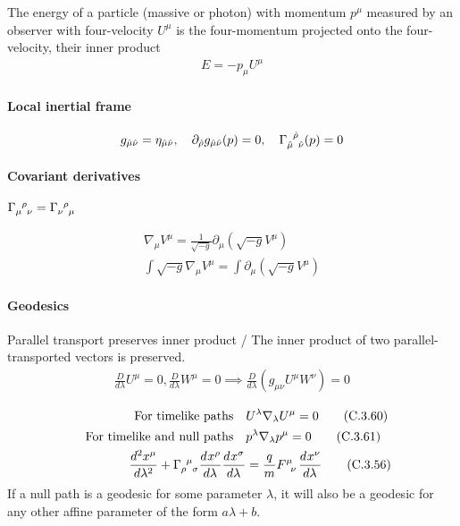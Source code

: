 \documentclass[main]{subfiles}
\begin{document}
\begin{multicols}{2}
The energy of a particle (massive or photon) with momentum $p^\mu$ measured by an observer with four-velocity $U^\mu$ is the four-momentum projected onto the four-velocity, their inner product
\begin{gather}
    E = -p_\mu U^\mu \tag{C.3.63}
\end{gather}

\paragraph{Local inertial frame}
\begin{align}
    g_{\hat{\mu}\hat{\nu}} = \eta_{\hat{\mu}\hat{\nu}},\quad 
    \partial_{\hat{\rho}} g_{\hat{\mu}\hat{\nu}}(p) = 0,\quad
    \Gamma\indices{_{\hat{\mu}}^{\hat{\rho}}_{\hat{\nu}}}(p) = 0
\end{align}

\paragraph{Covariant derivatives} $\Gamma\indices{_\mu^\rho_\nu} = \Gamma\indices{_\nu^\rho_\mu}$  

\begin{align}
    \nabla_\mu V^\mu = \frac{1}{\sqrt{-g}} \partial_\mu(\sqrt{-g} V^\mu)
    \\
    \int\sqrt{-g} \nabla_\mu V^\mu = \int 
    \partial_\mu(\sqrt{-g} V^\mu)
\end{align}

\paragraph{Geodesics}

Parallel transport preserves inner product / The inner product of two parallel-transported vectors is preserved.
\begin{align}
    \frac{D}{d\lambda} U^\mu = 0, \frac{D}{d\lambda} W^\mu = 0 \implies \frac{D}{d\lambda} (g_{\mu\nu} U^\mu W^\nu) = 0
\end{align}

\begin{align}
    \qq{For timelike paths} & U^\lambda \nabla_\lambda U^\mu = 0 \tag{C.3.60}
    \\
    \qq{For timelike and null paths} & p^\lambda \nabla_\lambda p^\mu = 0 \tag{C.3.61}
    \\
    \dv[2]{x^\mu}{\lambda} + \Gamma\indices{_\rho^\mu_\sigma}\dv{x^\rho}{\lambda}\dv{x^\sigma}{\lambda} &= \frac{q}{m}F\indices{^\mu_\nu}\dv{x^\nu}{\lambda}
    \tag{C.3.56}
\end{align}
If a null path is a geodesic for some parameter $\lambda$, it will also be a geodesic for any other affine parameter of the form $a\lambda + b$. 


\end{multicols}
\end{document}
